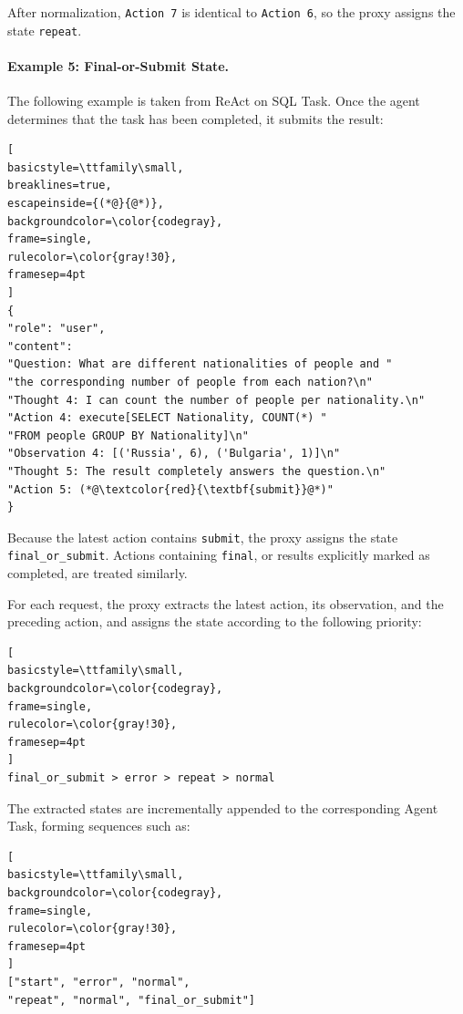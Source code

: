After normalization, \texttt{Action 7} is identical to
\texttt{Action 6}, so the proxy assigns the state \texttt{repeat}.


\paragraph{Example 5: Final-or-Submit State.}
The following example is taken from ReAct on SQL Task.
Once the agent determines that the task has been completed, it submits
the result:

\begin{lstlisting}[
basicstyle=\ttfamily\small,
breaklines=true,
escapeinside={(*@}{@*)},
backgroundcolor=\color{codegray},
frame=single,
rulecolor=\color{gray!30},
framesep=4pt
]
{
"role": "user",
"content":
"Question: What are different nationalities of people and "
"the corresponding number of people from each nation?\n"
"Thought 4: I can count the number of people per nationality.\n"
"Action 4: execute[SELECT Nationality, COUNT(*) "
"FROM people GROUP BY Nationality]\n"
"Observation 4: [('Russia', 6), ('Bulgaria', 1)]\n"
"Thought 5: The result completely answers the question.\n"
"Action 5: (*@\textcolor{red}{\textbf{submit}}@*)"
}
\end{lstlisting}

Because the latest action contains \texttt{submit}, the proxy assigns
the state \texttt{final\_or\_submit}. Actions containing
\texttt{final}, or results explicitly marked as completed, are treated
similarly.

For each request, the proxy extracts the latest action, its
observation, and the preceding action, and assigns the state according
to the following priority:

\begin{lstlisting}[
basicstyle=\ttfamily\small,
backgroundcolor=\color{codegray},
frame=single,
rulecolor=\color{gray!30},
framesep=4pt
]
final_or_submit > error > repeat > normal
\end{lstlisting}

The extracted states are incrementally appended to the corresponding
Agent Task, forming sequences such as:

\begin{lstlisting}[
basicstyle=\ttfamily\small,
backgroundcolor=\color{codegray},
frame=single,
rulecolor=\color{gray!30},
framesep=4pt
]
["start", "error", "normal",
"repeat", "normal", "final_or_submit"]
\end{lstlisting}

